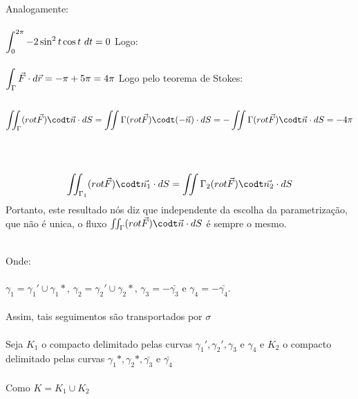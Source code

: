 \documentclass[11pt,a4paper]{article}
\newcommand{\integral}{\displaystyle\int}
\begin{document}
\begin{enumerate}
{{                        Analogamente:\\\\
                        $\integral_{0}^{2\pi} -2\sin^2 t\cos t\ dt =0\\\\$
                        Logo:\\\\
                        $\integral_{\Gamma} \vec{F}\cdot d\vec{r} = -\pi + 5\pi  = 4\pi\\\\$
                        Logo pelo teorema de Stokes:\\\\
                        $$\iint_{\Gamma} (rot \vec{F})\codt\vec{n} \cdot dS = \iint{\Gamma} (rot \vec{F})\codt (-\vec{n}) \cdot dS\\\\ = -\iint{\Gamma} (rot \vec{F})\codt\vec{n} \cdot dS = -4\pi\\\\$$
		        \\\\
		        \item $$\iint_{\Gamma_{1}} (rot \vec{F})\codt\vec{n_{1}} \cdot dS = \iint{\Gamma_{2}} (rot \vec{F})\codt \vec{n_{2}} \cdot dS\\\\$$
		        Portanto, este resultado nós diz que independente da escolha da parametrização, que não é unica, o fluxo $\iint_{\Gamma} (rot \vec{F})\codt\vec{n} \cdot dS$ é sempre o mesmo.
		        \\\\
		        \item Onde:\\\\
		        $\gamma_1 = \gamma_1 ' \cup \gamma_1 *$, $\gamma_2 = \gamma_2 ' \cup \gamma_2 *$, $\gamma_3 = -\bar{\gamma_3}$ e $\gamma_4 = -\bar{\gamma_4}$.\\\\
		        Assim, tais seguimentos são transportados por $\sigma$\\\\
		        Seja $K_1$ o compacto delimitado pelas curvas $\gamma_1 ',\gamma_2 ',\gamma_3$ e $\gamma_4$ e $K_2$ o compacto delimitado pelas curvas $\gamma_1 *, \gamma_2 *, \bar{\gamma_3}$ e $\bar{\gamma_4}$
		        \\\\ Como $K = K_1 \cup K_2$\\\\
}}
\end{enumerate}
\end{document}

